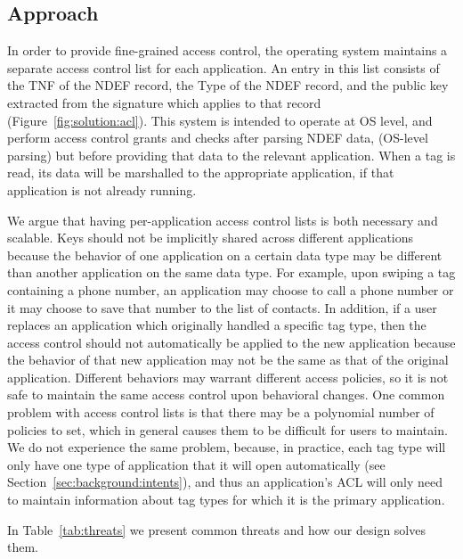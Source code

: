 \documentclass[12pt]{article}
\begin{document}
\subsection{Approach}
In order to provide fine-grained access control, the operating system maintains a separate access control list for each application.
An entry in this list consists of the TNF of the NDEF record, the Type of the NDEF record, and the public key extracted from the signature which applies to that record (Figure~\ref{fig:solution:acl}).
This system is intended to operate at OS level, and perform access control grants and checks after parsing NDEF data, (OS-level parsing) but before providing that data to the relevant application.
When a tag is read, its data will be marshalled to the appropriate application, if that application is not already running.

We argue that having per-application access control lists is both necessary and scalable.
Keys should not be implicitly shared across different applications because the behavior of one application on a certain data type may be different than another application on the same data type.
For example, upon swiping a tag containing a phone number, an application may choose to call a phone number or it may choose to save that number to the list of contacts.
In addition, if a user replaces an application which originally handled a specific tag type, then the access control should not automatically be applied to the new application because the behavior of that new application may not be the same as that of the original application.
Different behaviors may warrant different access policies, so it is not safe to maintain the same access control upon behavioral changes.
One common problem with access control lists is that there may be a polynomial number of policies to set, which in general causes them to be difficult for users to maintain.
We do not experience the same problem, because, in practice, each tag type will only have one type of application that it will open automatically (see Section~\ref{sec:background:intents}), and thus an application's ACL will only need to maintain information about tag types for which it is the primary application.

In Table~\ref{tab:threats} we present common threats and how our design solves them.
\end{document}
